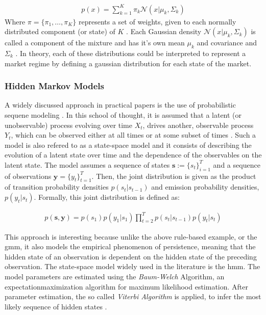 \begin{align}
p(x)=\sum_{k=1}^{K}\pi_k\mathcal{N}(x|\mu_k,\Sigma_k)
\label{eq:gaussian-mixture-model}
\end{align}
Where $\pi = \{\pi_1,\dots{},\pi_K\}$ represents a set of weights, given to each normally distributed component (or state) of $K$ \citep{machinelearning2020_chapter2}. Each Gaussian density 
$\mathcal{N}(x|\mu_k,\Sigma_k)$ is called a component of the mixture and has it's own mean $\mu_k$ and covariance and $\Sigma_k$ \citep{bishop_gmm}. 
In theory, each of these distributions could be interpreted to represent a market regime by defining a gaussian distribution for each state of the market.

\subsubsection{Hidden Markov Models}
A widely discussed approach in practical papers is the use of probabilistic sequene modeling \citet{machinelearning2020_chapter7}. In this school of thought, 
it is assumed that a latent (or unobservable) process evolving over time $X_t$, drives another, observable process $Y_t$, which can be observed either at all times or at some subset of times \citep{machinelearning2020_chapter7}.
Such a model is also refered to as a state-space model and it consists of describing the evolution of a latent state over time and the dependence of the observables on the latent state.
The model assumes a sequence of states $\boldsymbol{s}:=\{s_t\}^T_{i=1}$ and a sequence of observations $\boldsymbol{y}=\{y_t\}^T_{t=1}$. Then, the joint distribution is given as the product of transition probability densities $p(s_t|s_{t-1})$ and emission probability densities, $p(y_t|s_t)$.
Formally, this joint distribution is defined as: 

\begin{align}
p(\boldsymbol{s},\boldsymbol{y})=p(s_1)p(y_1|s_1)\prod_{t=2}^Tp(s_t|s_{t-1})p(y_t|s_t)
\label{eq:joint distribution of states and observations}
\end{align}

This approach is interesting because unlike the above rule-based example, or the \gls{gmm}, it also models the empirical phenomenon of persistence, meaning that the hidden state of an observation is dependent on the hidden state of the preceding observation. 
The state-space model widely used in the literature is the \gls{hmm}. The model parameters are estimated using the \emph{Baum-Welch} Algorithm, an \gls{expectationmaximization} algorithm for maximum likelihood estimation. 
After parameter estimation, the so called \emph{Viterbi Algorithm} is applied, to infer the most likely sequence of hidden states \citep{machinelearning2020_chapter7}.\\


